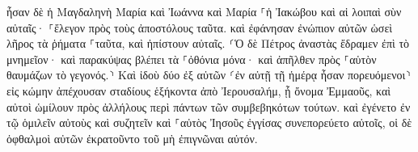 \documentclass{openreader}
\begin{document}
ἦσαν δὲ ἡ Μαγδαληνὴ Μαρία καὶ Ἰωάννα καὶ Μαρία ⸀ἡ Ἰακώβου καὶ αἱ λοιπαὶ σὺν αὐταῖς· ⸀ἔλεγον πρὸς τοὺς ἀποστόλους ταῦτα. 
καὶ ἐφάνησαν ἐνώπιον αὐτῶν ὡσεὶ λῆρος τὰ ῥήματα ⸀ταῦτα, καὶ ἠπίστουν αὐταῖς. 
⸂Ὁ δὲ Πέτρος ἀναστὰς ἔδραμεν ἐπὶ τὸ μνημεῖον· καὶ παρακύψας βλέπει τὰ ⸀ὀθόνια μόνα· καὶ ἀπῆλθεν πρὸς ⸀αὑτὸν θαυμάζων τὸ γεγονός.⸃ 
Καὶ ἰδοὺ δύο ἐξ αὐτῶν ⸂ἐν αὐτῇ τῇ ἡμέρᾳ ἦσαν πορευόμενοι⸃ εἰς κώμην ἀπέχουσαν σταδίους ἑξήκοντα ἀπὸ Ἰερουσαλήμ, ᾗ ὄνομα Ἐμμαοῦς, 
καὶ αὐτοὶ ὡμίλουν πρὸς ἀλλήλους περὶ πάντων τῶν συμβεβηκότων τούτων. 
καὶ ἐγένετο ἐν τῷ ὁμιλεῖν αὐτοὺς καὶ συζητεῖν καὶ ⸀αὐτὸς Ἰησοῦς ἐγγίσας συνεπορεύετο αὐτοῖς, 
οἱ δὲ ὀφθαλμοὶ αὐτῶν ἐκρατοῦντο τοῦ μὴ ἐπιγνῶναι αὐτόν. 
\end{document}
